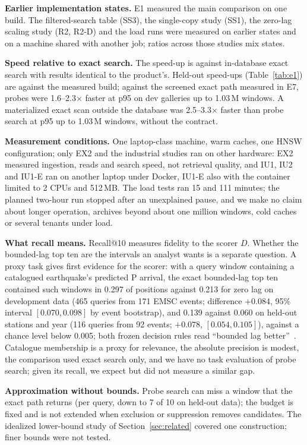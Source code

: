 \documentclass[sigconf]{acmart}
\begin{document}
\textbf{Earlier implementation states.} E1 measured the main comparison on one build. The filtered-search table (SS3), the single-copy study (SS1), the zero-lag scaling study (R2, R2-D) and the load runs were measured on earlier states and on a machine shared with another job; ratios across those studies mix states.

\ifdefined\SigmodSubmission\else
\textbf{Speed relative to exact search.} The speed-up is against in-database exact search with results identical to the product's. Held-out speed-ups (Table~\ref{tab:e1}) are against the measured build; against the screened exact path measured in E7, probes were 1.6--2.3$\times$ faster at p95 on dev galleries up to 1.03\,M windows. A materialized exact scan outside the database was 2.5--3.3$\times$ faster than probe search at p95 up to 1.03\,M windows, without the contract.
\fi

\textbf{Measurement conditions.} One laptop-class machine, warm caches, one HNSW configuration; only EX2 and the industrial studies ran on other hardware: EX2 measured ingestion, reads and search speed, not retrieval quality, and IU1, IU2 and IU1-E ran on another laptop under Docker, IU1-E also with the container limited to 2 CPUs and 512\,MB. The load tests ran 15 and 111 minutes; the planned two-hour run stopped after an unexplained pause, and we make no claim about longer operation, archives beyond about one million windows, cold caches or several tenants under load.

\textbf{What recall means.} Recall@10 measures fidelity to the scorer $D$. Whether the bounded-lag top ten are the intervals an analyst wants is a separate question. A proxy task gives first evidence for the scorer: with a query window containing a catalogued earthquake's predicted P arrival, the exact bounded-lag top ten contained such windows in 0.297 of positions against 0.213 for zero lag on development data (465 queries from 171 EMSC events; difference $+0.084$, 95\% interval $[0.070, 0.098]$ by event bootstrap), and 0.139 against 0.060 on held-out stations and year (116 queries from 92 events; $+0.078$, $[0.054, 0.105]$), against a chance level below 0.005; both frozen decision rules read ``bounded lag better''~\cite{e5}. Catalogue membership is a proxy for relevance, the absolute precision is modest, the comparison used exact search only, and we have no task evaluation of probe search; given its recall, we expect but did not measure a similar gap.

\textbf{Approximation without bounds.} Probe search can miss a window that the exact path returns (per query, down to 7 of 10 on held-out data); the budget is fixed and is not extended when exclusion or suppression removes candidates. The idealized lower-bound study of Section~\ref{sec:related} covered one construction; finer bounds were not tested.
\end{document}
